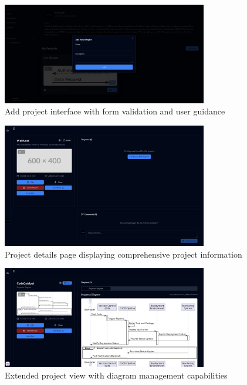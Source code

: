 \begin{figure}[H]
\centering
\includegraphics[width=0.8\textwidth]{screenshots/add-project.png}
\caption{Add project interface with form validation and user guidance}
\label{fig:add_project}
\end{figure}

\begin{figure}[H]
\centering
\includegraphics[width=0.8\textwidth]{screenshots/project-page.png}
\caption{Project details page displaying comprehensive project information}
\label{fig:project_page}
\end{figure}

\begin{figure}[H]
\centering
\includegraphics[width=0.8\textwidth]{screenshots/project-page2.png}
\caption{Extended project view with diagram management capabilities}
\label{fig:project_page2}
\end{figure}

